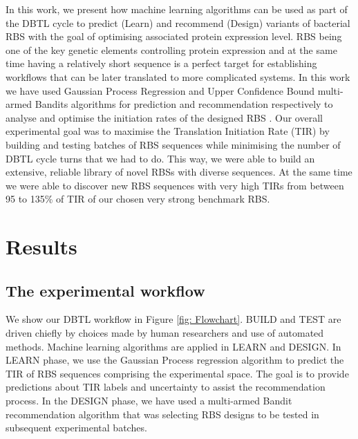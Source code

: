 \documentclass{article}
\begin{document}
In this work, we present how machine learning algorithms can be used as part of the DBTL cycle to predict (Learn) and recommend (Design) variants of bacterial RBS with the goal of optimising associated protein expression level. 
RBS being one of the key genetic elements controlling protein expression and at the same time having a relatively short sequence is a perfect target for establishing workflows that can be later translated to more complicated systems.
In this work we have used Gaussian Process Regression \cite{Rasmussen2004} and Upper Confidence Bound multi-armed Bandits algorithms \cite{desautels2014parallelizing} for prediction and recommendation respectively to analyse and optimise the initiation rates of the designed RBS .
Our overall experimental goal was to maximise the Translation Initiation Rate (TIR) by building and testing batches of RBS sequences while minimising the number of DBTL cycle turns that we had to do.
This way, we were able to build an extensive, reliable library of novel RBSs with diverse sequences.
At the same time we were able to discover new RBS sequences with very high TIRs from between 95 to 135\% of TIR of our chosen very strong benchmark RBS. 

\section{Results}

\subsection{The experimental workflow}

We show our DBTL workflow in Figure \ref{fig: Flowchart}.
BUILD and TEST are driven chiefly by choices made by human researchers and use of automated methods.
Machine learning algorithms are applied in LEARN and DESIGN.
In LEARN phase, we use the Gaussian Process regression algorithm to predict the TIR of RBS sequences comprising the experimental space.
The goal is to provide predictions about TIR labels and uncertainty to assist the recommendation process.
In the DESIGN phase, we have used a multi-armed Bandit recommendation algorithm that was selecting RBS designs to be tested in subsequent experimental batches.\\
\end{document}
